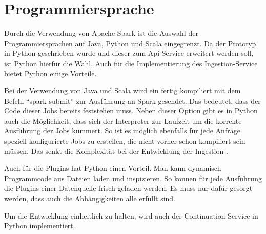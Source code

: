 \section{Programmiersprache}

Durch die Verwendung von Apache Spark ist die Auswahl der Programmiersprachen auf Java, Python und Scala eingegrenzt.
Da der Prototyp in Python geschrieben wurde und dieser zum Api-Service erweitert werden soll, ist Python hierfür die Wahl.
Auch für die Implementierung des Ingestion-Service bietet Python einige Vorteile.

Bei der Verwendung von Java und Scala wird ein fertig kompiliert mit dem Befehl "`spark-submit"' zur Ausführung an Spark gesendet.
Das bedeutet, dass der Code dieser Jobs bereits feststehen muss.
Neben dieser Option gibt es in Python auch die Möglichkeit, dass sich der Interpreter zur Laufzeit um die korrekte Ausführung der Jobs kümmert.
So ist es möglich ebenfalls für jede Anfrage speziell konfigurierte Jobs zu erstellen, die nicht vorher schon kompiliert sein müssen.
Das senkt die Komplexität bei der Entwicklung der Ingestion \parencite{pyspark-int}.

Auch für die Plugins hat Python einen Vorteil.
Man kann dynamisch Programmcode aus Dateien laden und inspizieren.
So können für jede Ausführung die Plugins einer Datenquelle frisch geladen werden.
Es muss nur dafür gesorgt werden, dass auch die Abhängigkeiten alle erfüllt sind.

Um die Entwicklung einheitlich zu halten, wird auch der Continuation-Service in Python implementiert.